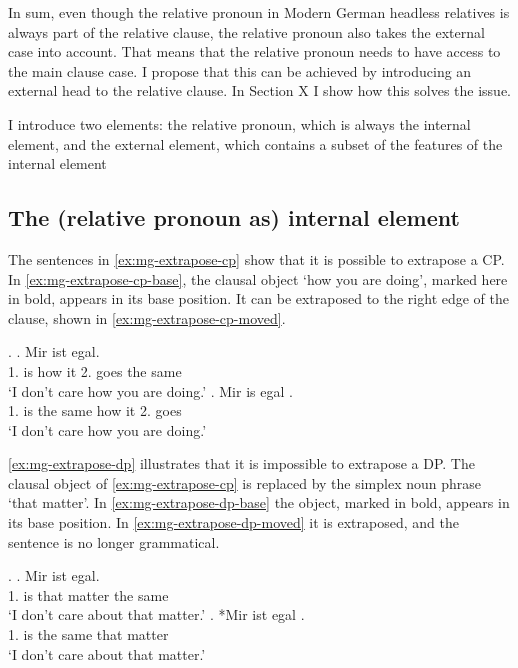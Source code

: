 In sum, even though the relative pronoun in Modern German headless relatives is always part of the relative clause, the relative pronoun also takes the external case into account. That means that the relative pronoun needs to have access to the main clause case. I propose that this can be achieved by introducing an external head to the relative clause. In Section X I show how this solves the issue.

I introduce two elements: the relative pronoun, which is always the internal element, and the external element, which contains a subset of the features of the internal element



\subsection{The (relative pronoun as) internal element}

The sentences in \ref{ex:mg-extrapose-cp} show that it is possible to extrapose a CP. In \ref{ex:mg-extrapose-cp-base}, the clausal object  `how you are doing', marked here in bold, appears in its base position. It can be extraposed to the right edge of the clause, shown in \ref{ex:mg-extrapose-cp-moved}.

\ex.\label{ex:mg-extrapose-cp}
\ag. Mir ist     egal.\\
 1. is how it 2. goes {the same}\\
 `I don't care how you are doing.'\label{ex:mg-extrapose-cp-base}
\bg. Mir is egal    .\\
 1. is {the same} how it 2. goes\\
 `I don't care how you are doing.' \label{ex:mg-extrapose-cp-moved}

\ref{ex:mg-extrapose-dp} illustrates that it is impossible to extrapose a DP. The clausal object of \ref{ex:mg-extrapose-cp} is replaced by the simplex noun phrase  `that matter'.
In \ref{ex:mg-extrapose-dp-base} the object, marked in bold, appears in its base position. In \ref{ex:mg-extrapose-dp-moved} it is extraposed, and the sentence is no longer grammatical.

\ex.\label{ex:mg-extrapose-dp}
\ag. Mir ist   egal.\\
 1. is that matter {the same}\\
 `I don't care about that matter.'\label{ex:mg-extrapose-dp-base}
\bg. *Mir ist egal  .\\
 1. is {the same} that matter\\
 `I don't care about that matter.' \label{ex:mg-extrapose-dp-moved}

